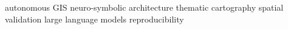 autonomous GIS \textperiodcentered{} neuro-symbolic architecture \textperiodcentered{} thematic cartography \textperiodcentered{} spatial validation \textperiodcentered{} large language models \textperiodcentered{} reproducibility
